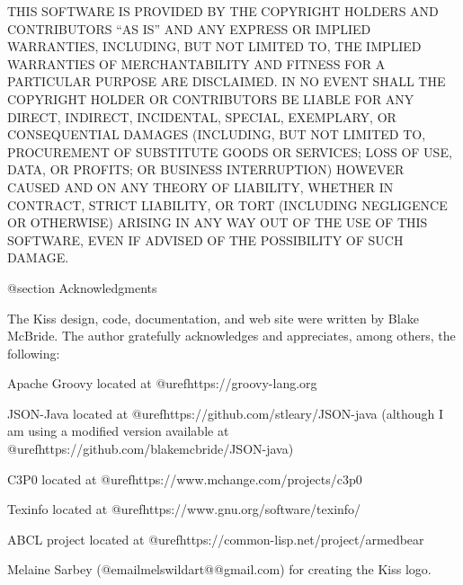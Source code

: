 THIS SOFTWARE IS PROVIDED BY THE COPYRIGHT HOLDERS AND CONTRIBUTORS
``AS IS'' AND ANY EXPRESS OR IMPLIED WARRANTIES, INCLUDING, BUT NOT
LIMITED TO, THE IMPLIED WARRANTIES OF MERCHANTABILITY AND FITNESS FOR
A PARTICULAR PURPOSE ARE DISCLAIMED. IN NO EVENT SHALL THE COPYRIGHT
HOLDER OR CONTRIBUTORS BE LIABLE FOR ANY DIRECT, INDIRECT, INCIDENTAL,
SPECIAL, EXEMPLARY, OR CONSEQUENTIAL DAMAGES (INCLUDING, BUT NOT
LIMITED TO, PROCUREMENT OF SUBSTITUTE GOODS OR SERVICES; LOSS OF USE,
DATA, OR PROFITS; OR BUSINESS INTERRUPTION) HOWEVER CAUSED AND ON ANY
THEORY OF LIABILITY, WHETHER IN CONTRACT, STRICT LIABILITY, OR TORT
(INCLUDING NEGLIGENCE OR OTHERWISE) ARISING IN ANY WAY OUT OF THE USE
OF THIS SOFTWARE, EVEN IF ADVISED OF THE POSSIBILITY OF SUCH DAMAGE.

@section Acknowledgments

The Kiss design, code, documentation, and web site were written by
Blake McBride.  The author gratefully acknowledges and appreciates,
among others, the following:

Apache Groovy located at @uref{https://groovy-lang.org}

JSON-Java located at @uref{https://github.com/stleary/JSON-java}
(although I am using a modified version available at
@uref{https://github.com/blakemcbride/JSON-java})

C3P0 located at @uref{https://www.mchange.com/projects/c3p0}

Texinfo located at @uref{https://www.gnu.org/software/texinfo/}

ABCL project located at @uref{https://common-lisp.net/project/armedbear}

Melaine Sarbey (@email{melswildart@@gmail.com}) for creating the Kiss logo.

